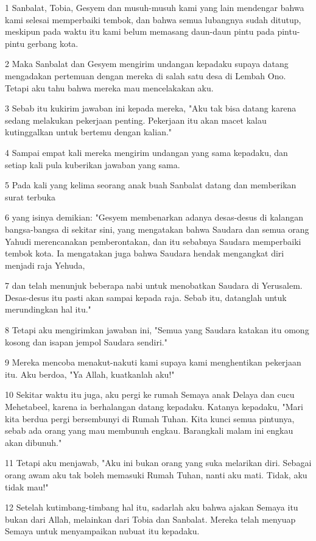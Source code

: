 \par 1 Sanbalat, Tobia, Gesyem dan musuh-musuh kami yang lain mendengar bahwa kami selesai memperbaiki tembok, dan bahwa semua lubangnya sudah ditutup, meskipun pada waktu itu kami belum memasang daun-daun pintu pada pintu-pintu gerbang kota.
\par 2 Maka Sanbalat dan Gesyem mengirim undangan kepadaku supaya datang mengadakan pertemuan dengan mereka di salah satu desa di Lembah Ono. Tetapi aku tahu bahwa mereka mau mencelakakan aku.
\par 3 Sebab itu kukirim jawaban ini kepada mereka, "Aku tak bisa datang karena sedang melakukan pekerjaan penting. Pekerjaan itu akan macet kalau kutinggalkan untuk bertemu dengan kalian."
\par 4 Sampai empat kali mereka mengirim undangan yang sama kepadaku, dan setiap kali pula kuberikan jawaban yang sama.
\par 5 Pada kali yang kelima seorang anak buah Sanbalat datang dan memberikan surat terbuka
\par 6 yang isinya demikian: "Gesyem membenarkan adanya desas-desus di kalangan bangsa-bangsa di sekitar sini, yang mengatakan bahwa Saudara dan semua orang Yahudi merencanakan pemberontakan, dan itu sebabnya Saudara memperbaiki tembok kota. Ia mengatakan juga bahwa Saudara hendak mengangkat diri menjadi raja Yehuda,
\par 7 dan telah menunjuk beberapa nabi untuk menobatkan Saudara di Yerusalem. Desas-desus itu pasti akan sampai kepada raja. Sebab itu, datanglah untuk merundingkan hal itu."
\par 8 Tetapi aku mengirimkan jawaban ini, "Semua yang Saudara katakan itu omong kosong dan isapan jempol Saudara sendiri."
\par 9 Mereka mencoba menakut-nakuti kami supaya kami menghentikan pekerjaan itu. Aku berdoa, "Ya Allah, kuatkanlah aku!"
\par 10 Sekitar waktu itu juga, aku pergi ke rumah Semaya anak Delaya dan cucu Mehetabeel, karena ia berhalangan datang kepadaku. Katanya kepadaku, "Mari kita berdua pergi bersembunyi di Rumah Tuhan. Kita kunci semua pintunya, sebab ada orang yang mau membunuh engkau. Barangkali malam ini engkau akan dibunuh."
\par 11 Tetapi aku menjawab, "Aku ini bukan orang yang suka melarikan diri. Sebagai orang awam aku tak boleh memasuki Rumah Tuhan, nanti aku mati. Tidak, aku tidak mau!"
\par 12 Setelah kutimbang-timbang hal itu, sadarlah aku bahwa ajakan Semaya itu bukan dari Allah, melainkan dari Tobia dan Sanbalat. Mereka telah menyuap Semaya untuk menyampaikan nubuat itu kepadaku.
